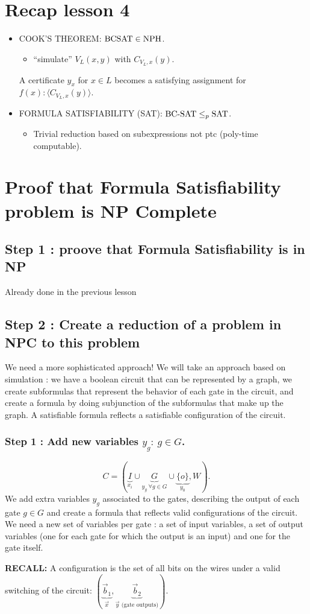 \section{Recap lesson 4}
\begin{itemize}
\item COOK'S THEOREM: $\mathrm{BCSAT}\in\mathrm{NPH}$.
\begin{itemize}\item ``simulate'' $V_L(x,y)$ with $C_{V_L,x}(y)$.\end{itemize}
A certificate $y_x$ for $x\in L$ becomes a satisfying assignment for $f(x):\langle C_{V_L,x}(y)\rangle$.
\item FORMULA SATISFIABILITY (SAT): $\mathrm{BC\text{-}SAT}\leq_p\mathrm{SAT}$.
\begin{itemize}\item Trivial reduction based on subexpressions not ptc (poly-time computable).\end{itemize}
\end{itemize}

\section{Proof that Formula Satisfiability problem is NP Complete}
\subsection{Step 1 : proove that Formula Satisfiability is in NP}
Already done in the previous lesson
\subsection{Step 2 : Create a reduction of a problem in NPC to this problem}
We need a more sophisticated approach!
We will take an approach based on simulation : we have a boolean circuit that can be represented by a graph, we create subformulas that represent the behavior of each gate in the circuit, and create a formula by doing subjunction of the subformulas that make up the graph. 
A satisfiable formula reflects a satisfiable configuration of the circuit. 

\subsubsection{Step 1 : Add new variables $y_g:\ g\in G$.}
\[
C=(\underbrace{I}_{x_i}\cup\underbrace{G}_{y_g\ \forall g\in G}\cup\underbrace{\{o\}}_{y_0},W).
\]
We add extra variables $y_g$ associated to the gates, describing the output of each gate $g\in G$ and create a formula that reflects valid configurations of the circuit.
We need a new set of variables per gate : a set of input variables, a set of output variables (one for each gate for which the output is an input) and one for the gate itself.  

\textbf{RECALL:} A configuration is the set of all bits on the wires under a valid switching of the circuit: $(\underbrace{\vec b_1}_{\vec x},\underbrace{\vec b_2}_{\vec y\text{ (gate outputs)}})$.
